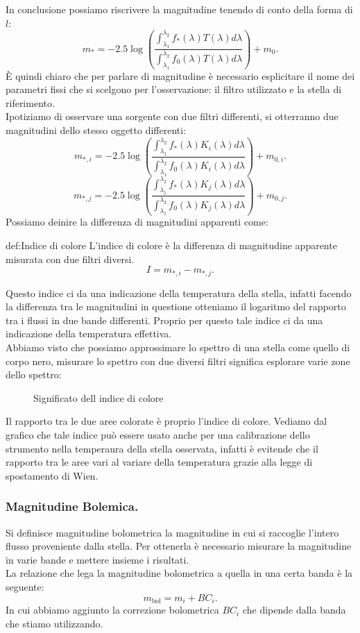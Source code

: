 In conclusione possiamo riscrivere la magnitudine tenendo di conto della forma di $l$:
\[
	m_{*} 
	=
	- 2.5 \log \left( 
	\frac{
	\int_{\lambda_1}^{\lambda_2} 
	f_{*}( \lambda ) T( \lambda ) d\lambda }
	{
	\int_{\lambda_1}^{\lambda_2}  
	f_0( \lambda ) T( \lambda ) d\lambda } 
	\right) +
	m_0
.\] 
È quindi chiaro che per parlare di magnitudine è necessario esplicitare il nome dei parametri fissi che si scelgono per l'osservazione: il filtro utilizzato e la stella di riferimento.\\
Ipotiziamo di osservare una sorgente con due filtri differenti, si otterranno due magnitudini dello stesso oggetto differenti:
\[
	m_{*,i} 
	=
	- 2.5 \log \left( 
	\frac{
	\int_{\lambda_1}^{\lambda_2} 
	f_{*}( \lambda ) K_i( \lambda ) d\lambda }
	{
	\int_{\lambda_1}^{\lambda_2}  
	f_0( \lambda ) K_i( \lambda ) d\lambda } 
	\right) +
	m_{0,i}
.\] 
\[
	m_{*,j} 
	=
	- 2.5 \log \left( 
	\frac{
	\int_{\lambda_1}^{\lambda_2} 
	f_{*}( \lambda ) K_j( \lambda ) d\lambda }
	{
	\int_{\lambda_1}^{\lambda_2}  
	f_0( \lambda ) K_j( \lambda ) d\lambda } 
	\right) +
	m_{0,j}
.\]
Possiamo deinire la differenza di magnitudini apparenti come:
\begin{defn}{def:Indice di colore}
	L'indice di colore è la differenza di magnitudine apparente misurata con due filtri diversi.
	\[
		I = m_{*,i} - m_{*,j}
	.\] 
\end{defn}
Questo indice ci da una indicazione della temperatura della stella, infatti facendo la differenza tra le magnitudini in questione otteniamo il logaritmo del rapporto tra i flussi in due bande differenti. 
Proprio per questo tale indice ci da una indicazione della temperatura effettiva. \\
Abbiamo visto che possiamo approssimare lo spettro di una stella come quello di corpo nero, misurare lo spettro con due diversi filtri significa esplorare varie zone dello spettro:
\begin{figure}[H]
    \centering
    \caption{Significato dell indice di colore}
    \label{fig:significato-dell-indice-di-colore}
\end{figure}
\noindent
Il rapporto tra le due aree colorate è proprio l'indice di colore. Vediamo dal grafico che tale indice può essere usato anche per una calibrazione dello strumento nella temperaura della stella osservata, infatti è evitende che il rapporto tra le aree vari al variare della temperatura grazie alla legge di spostamento di Wien.\\
\subsubsection{Magnitudine Bolemica.}
\label{subsubsec:Magnitudine Bolometrica.}
Si definisce magnitudine bolometrica la magnitudine in cui si raccoglie l'intero flusso proveniente dalla stella. Per ottenerla è necessario misurare la magnitudine in varie bande e mettere insieme i risultati.\\
La relazione che lega la magnitudine bolometrica a quella in una certa banda è la seguente:
\[
	m_{\text{bol}}= m_{i}+ BC_i
.\] 
In cui abbiamo aggiunto la correzione bolometrica $BC_i$ che dipende dalla banda che stiamo utilizzando.
